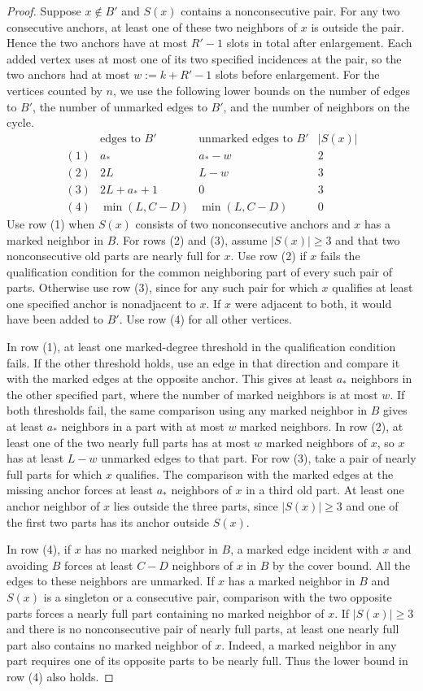 \documentclass[preprint,11pt,numbers]{elsarticle-arxiv}
\numberwithin{equation}{section}
\theoremstyle{definition}
\begin{document}
\begin{proof}
Suppose $x\notin B'$ and $S(x)$ contains a nonconsecutive
pair. For any two consecutive anchors, at least one of these
two neighbors of $x$ is outside the pair. Hence the two anchors
have at most $R'-1$ slots in total after enlargement. Each
added vertex uses at most one of its two specified incidences
at the pair, so the two anchors had at most
$w:=k+R'-1$ slots before enlargement. For the vertices counted
by $n$, we use the following lower bounds on the number of
edges to $B'$, the number of unmarked edges to $B'$, and the
number of neighbors on the cycle.
\[
\begin{array}{c|ccc}
 &\text{edges to }B'&\text{unmarked edges to }B'&|S(x)|\\ \hline
 (1)&a_*&a_*-w&2\\
 (2)&2L&L-w&3\\
 (3)&2L+a_*+1&0&3\\
 (4)&\min(L,C-D)&\min(L,C-D)&0
\end{array}
\]
Use row (1) when $S(x)$ consists of two nonconsecutive
anchors and $x$ has a marked neighbor in $B$. For rows (2)
and (3), assume $|S(x)|\geq3$ and that two nonconsecutive old
parts are nearly full for $x$. Use row (2) if $x$ fails the
qualification condition for the common neighboring part of every
such pair of parts. Otherwise use row (3), since for any such
pair for which $x$ qualifies at least one specified anchor is
nonadjacent to $x$. If $x$ were adjacent to both, it would have
been added to $B'$. Use row (4) for all other vertices.

In row (1), at least one marked-degree threshold in the
qualification condition fails. If the other threshold holds,
use an edge in that direction and compare it with the marked
edges at the opposite anchor. This gives at least $a_*$ neighbors
in the other specified part, where the number of marked neighbors
is at most $w$. If both thresholds fail, the same comparison
using any marked neighbor in $B$ gives at least $a_*$ neighbors
in a part with at most $w$ marked neighbors. In row (2), at
least one of the two nearly full parts has at most $w$
marked neighbors of $x$, so $x$ has at least $L-w$ unmarked
edges to that part. For row (3), take a pair of nearly full parts
for which $x$ qualifies. The comparison with the marked edges
at the missing anchor forces at least $a_*$ neighbors of $x$
in a third old part. At least one anchor neighbor of $x$
lies outside the three parts, since $|S(x)|\geq3$ and one of
the first two parts has its anchor outside $S(x)$.

In row (4), if $x$ has no marked neighbor in $B$, a marked
edge incident with $x$ and avoiding $B$ forces at least $C-D$
neighbors of $x$ in $B$ by the cover bound. All the edges to
these neighbors are unmarked. If $x$ has a marked neighbor in
$B$ and $S(x)$ is a singleton or a consecutive pair, comparison
with the two opposite parts forces a nearly full part containing
no marked neighbor of $x$. If $|S(x)|\geq3$ and there is no
nonconsecutive pair of nearly full parts, at least one nearly
full part also contains no marked neighbor of $x$. Indeed, a
marked neighbor in any part requires one of its opposite parts
to be nearly full. Thus the lower bound in row (4) also holds.


\end{proof}
\end{document}
